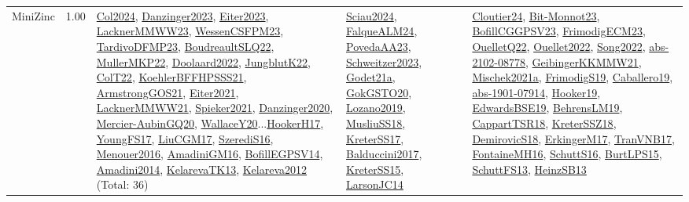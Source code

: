 {\begin{longtable}{p{3cm}r>{\raggedright\arraybackslash}p{6cm}>{\raggedright\arraybackslash}p{6cm}>{\raggedright\arraybackslash}p{8cm}}
\index{MiniZinc}\index{CPSystems!MiniZinc}MiniZinc &  1.00 & \hyperref[detail:Col2024]{Col2024}, \hyperref[detail:Danzinger2023]{Danzinger2023}, \hyperref[detail:Eiter2023]{Eiter2023}, \hyperref[detail:LacknerMMWW23]{LacknerMMWW23}, \hyperref[detail:WessenCSFPM23]{WessenCSFPM23}, \hyperref[detail:TardivoDFMP23]{TardivoDFMP23}, \hyperref[detail:BoudreaultSLQ22]{BoudreaultSLQ22}, \hyperref[detail:MullerMKP22]{MullerMKP22}, \hyperref[detail:Doolaard2022]{Doolaard2022}, \hyperref[detail:JungblutK22]{JungblutK22}, \hyperref[detail:ColT22]{ColT22}, \hyperref[detail:KoehlerBFFHPSSS21]{KoehlerBFFHPSSS21}, \hyperref[detail:ArmstrongGOS21]{ArmstrongGOS21}, \hyperref[detail:Eiter2021]{Eiter2021}, \hyperref[detail:LacknerMMWW21]{LacknerMMWW21}, \hyperref[detail:Spieker2021]{Spieker2021}, \hyperref[detail:Danzinger2020]{Danzinger2020}, \hyperref[detail:Mercier-AubinGQ20]{Mercier-AubinGQ20}, \hyperref[detail:WallaceY20]{WallaceY20}...\hyperref[detail:HookerH17]{HookerH17}, \hyperref[detail:YoungFS17]{YoungFS17}, \hyperref[detail:LiuCGM17]{LiuCGM17}, \hyperref[detail:SzerediS16]{SzerediS16}, \hyperref[detail:Menouer2016]{Menouer2016}, \hyperref[detail:AmadiniGM16]{AmadiniGM16}, \hyperref[detail:BofillEGPSV14]{BofillEGPSV14}, \hyperref[detail:Amadini2014]{Amadini2014}, \hyperref[detail:KelarevaTK13]{KelarevaTK13}, \hyperref[detail:Kelareva2012]{Kelareva2012} (Total: 36) & \hyperref[detail:Sciau2024]{Sciau2024}, \hyperref[detail:FalqueALM24]{FalqueALM24}, \hyperref[detail:PovedaAA23]{PovedaAA23}, \hyperref[detail:Schweitzer2023]{Schweitzer2023}, \hyperref[detail:Godet21a]{Godet21a}, \hyperref[detail:GokGSTO20]{GokGSTO20}, \hyperref[detail:Lozano2019]{Lozano2019}, \hyperref[detail:MusliuSS18]{MusliuSS18}, \hyperref[detail:KreterSS17]{KreterSS17}, \hyperref[detail:Balduccini2017]{Balduccini2017}, \hyperref[detail:KreterSS15]{KreterSS15}, \hyperref[detail:LarsonJC14]{LarsonJC14} & \hyperref[detail:Cloutier24]{Cloutier24}, \hyperref[detail:Bit-Monnot23]{Bit-Monnot23}, \hyperref[detail:BofillCGGPSV23]{BofillCGGPSV23}, \hyperref[detail:FrimodigECM23]{FrimodigECM23}, \hyperref[detail:OuelletQ22]{OuelletQ22}, \hyperref[detail:Ouellet2022]{Ouellet2022}, \hyperref[detail:Song2022]{Song2022}, \hyperref[detail:abs-2102-08778]{abs-2102-08778}, \hyperref[detail:GeibingerKKMMW21]{GeibingerKKMMW21}, \hyperref[detail:Mischek2021a]{Mischek2021a}, \hyperref[detail:FrimodigS19]{FrimodigS19}, \hyperref[detail:Caballero19]{Caballero19}, \hyperref[detail:abs-1901-07914]{abs-1901-07914}, \hyperref[detail:Hooker19]{Hooker19}, \hyperref[detail:EdwardsBSE19]{EdwardsBSE19}, \hyperref[detail:BehrensLM19]{BehrensLM19}, \hyperref[detail:CappartTSR18]{CappartTSR18}, \hyperref[detail:KreterSSZ18]{KreterSSZ18}, \hyperref[detail:DemirovicS18]{DemirovicS18}, \hyperref[detail:ErkingerM17]{ErkingerM17}, \hyperref[detail:TranVNB17]{TranVNB17}, \hyperref[detail:FontaineMH16]{FontaineMH16}, \hyperref[detail:SchuttS16]{SchuttS16}, \hyperref[detail:BurtLPS15]{BurtLPS15}, \hyperref[detail:SchuttFS13]{SchuttFS13}, \hyperref[detail:HeinzSB13]{HeinzSB13}\\

\end{longtable}}

